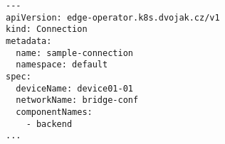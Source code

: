 \begin{lstfloat}
\begin{lstlisting}[style=mybashstyle, caption={Ukázka CRD connection}, label={sample:connection}]
---
apiVersion: edge-operator.k8s.dvojak.cz/v1
kind: Connection
metadata:
  name: sample-connection
  namespace: default
spec:
  deviceName: device01-01
  networkName: bridge-conf
  componentNames:
    - backend
...
\end{lstlisting}
\end{lstfloat}